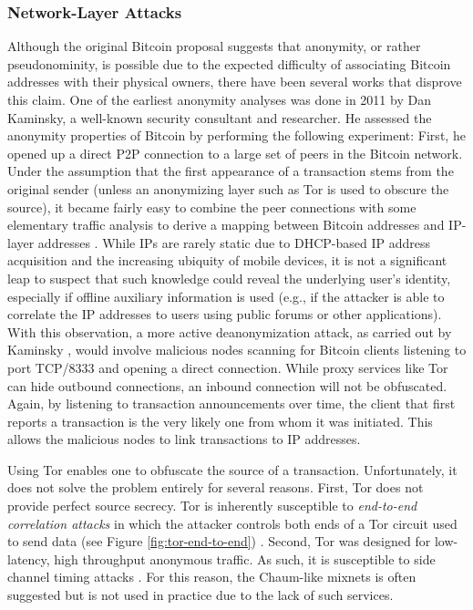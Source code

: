 \subsubsection{Network-Layer Attacks}
Although the original Bitcoin proposal suggests that anonymity, or rather pseudonominity, is possible due to the expected difficulty of associating Bitcoin addresses with their physical owners, there have been several works that disprove this claim. One of the earliest anonymity analyses was done in 2011 by Dan Kaminsky, a well-known security consultant and researcher. He assessed the anonymity properties of Bitcoin by performing the following experiment: First, he opened up a direct P2P connection to a large set of peers in the Bitcoin network. Under the assumption that the first appearance of a transaction stems from the original sender (unless an anonymizing layer such as Tor is used to obscure the source), it became fairly easy to combine the peer connections with some elementary traffic analysis to derive a mapping between Bitcoin addresses and IP-layer addresses \cite{kaminsky}. While IPs are rarely static due to DHCP-based IP address acquisition and the increasing ubiquity of mobile devices, it is not a significant leap to suspect that such knowledge could reveal the underlying user's identity, especially if offline auxiliary information is used (e.g., if the attacker is able to correlate the IP addresses to users using public forums or other applications). With this observation, a more active deanonymization attack, as carried out by Kaminsky \cite{kaminsky,ReidHarrigan13}, would involve malicious nodes scanning for Bitcoin clients listening to port TCP/8333 and opening a direct connection. While proxy services like Tor can hide outbound connections, an inbound connection will not be obfuscated. Again, by listening to transaction announcements over time, the client that first reports a transaction is the very likely one from whom it was initiated. This allows the malicious nodes to link transactions to IP addresses.

Using Tor enables one to obfuscate the source of a transaction. Unfortunately, it does not solve the problem entirely for several reasons. First, Tor does not provide perfect source secrecy. Tor is inherently susceptible to \emph{end-to-end correlation attacks} in which the attacker controls both ends of a Tor circuit used to send data (see Figure \ref{fig:tor-end-to-end}) \cite{?}. Second, Tor was designed for low-latency, high throughput anonymous traffic. As such, it is susceptible to side channel timing attacks \cite{bitcoin-tor-wiki}. For this reason, the Chaum-like mixnets is often suggested but is not used in practice due to the lack of such services. 

